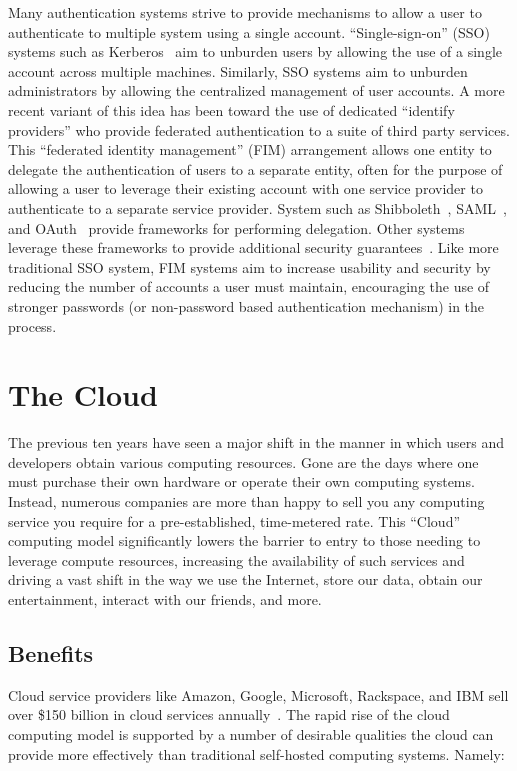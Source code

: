 Many authentication systems strive to provide mechanisms to allow a
user to authenticate to multiple system using a single account.
``Single-sign-on'' (SSO) systems such as Kerberos~\cite{neuman1994,
  kohl1994} aim to unburden users by allowing the use of a single
account across multiple machines. Similarly, SSO systems aim to
unburden administrators by allowing the centralized management of user
accounts. A more recent variant of this idea has been toward the use
of dedicated ``identify providers'' who provide federated
authentication to a suite of third party services. This ``federated
identity management'' (FIM) arrangement allows one entity to delegate
the authentication of users to a separate entity, often for the
purpose of allowing a user to leverage their existing account with one
service provider to authenticate to a separate service
provider. System such as Shibboleth~\cite{leandro2012},
SAML~\cite{SAML}, and OAuth~\cite{oauth} provide frameworks for
performing delegation. Other systems leverage these frameworks to
provide additional security guarantees~\cite{bhargava2011}. Like more
traditional SSO system, FIM systems aim to increase usability and
security by reducing the number of accounts a user must maintain,
encouraging the use of stronger passwords (or non-password based
authentication mechanism) in the process.

\section{The Cloud}
\label{chap:background:cloud}

The previous ten years have seen a major shift in the manner in which
users and developers obtain various computing resources. Gone are the
days where one must purchase their own hardware or operate their own
computing systems. Instead, numerous companies are more than happy to
sell you any computing service you require for a pre-established,
time-metered rate. This ``Cloud'' computing model significantly lowers
the barrier to entry to those needing to leverage compute resources,
increasing the availability of such services and driving a vast shift
in the way we use the Internet, store our data, obtain our
entertainment, interact with our friends, and more.

\subsection{Benefits}

Cloud service providers like Amazon, Google, Microsoft, Rackspace, and
IBM sell over \$150 billion in cloud services
annually~\cite{flood2013}. The rapid rise of the cloud computing model
is supported by a number of desirable qualities the cloud can provide
more effectively than traditional self-hosted computing
systems. Namely:


